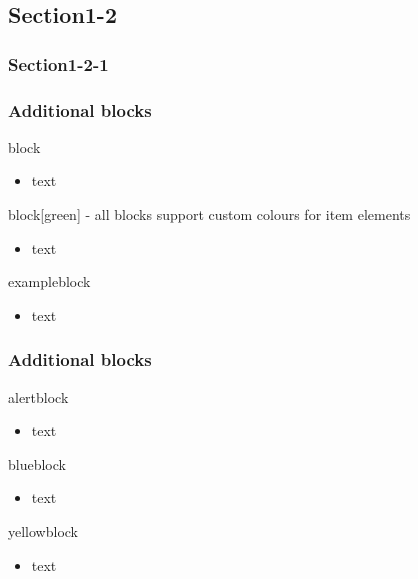 \documentclass[t,compress,aspectratio=169]{beamer}
\begin{document}
\subsection{Section1-2}
\subsubsection{Section1-2-1}
\begin{frame}
\frametitle{Additional blocks}
\begin{block}{block}
\begin{itemize} \item text \end{itemize}
\end{block}
\begin{block}[green]{block[green] - all blocks support custom colours for item elements}
\begin{itemize} \item text \end{itemize}
\end{block}
\begin{exampleblock}{exampleblock}
\begin{itemize} \item text \end{itemize}
\end{exampleblock}
\end{frame}

\begin{frame}
\frametitle{Additional blocks}
\begin{alertblock}{alertblock}
\begin{itemize} \item text \end{itemize}
\end{alertblock}
\begin{blueblock}{blueblock}
\begin{itemize} \item text \end{itemize}
\end{blueblock}
\begin{yellowblock}{yellowblock}
\begin{itemize} \item text \end{itemize}
\end{yellowblock}
\end{frame}
\end{document}

